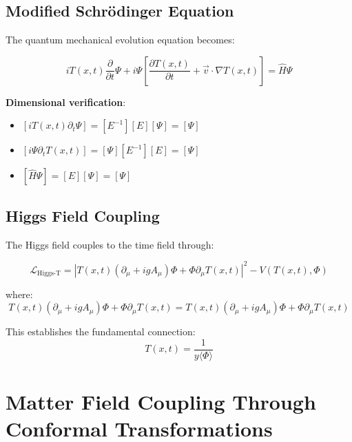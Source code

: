 \documentclass[12pt,a4paper]{article}
\newcommand{\Tfield}{T(x,t)}
\newcommand{\DhiggsT}{\Tfield (\partial_\mu + ig A_\mu) \Phi + \Phi \partial_\mu \Tfield}
\theoremstyle{definition}
\theoremstyle{remark}
\begin{document}
	\subsection{Modified Schrödinger Equation}
	\label{subsec:modified_schrodinger}
	
	The quantum mechanical evolution equation becomes:
	
	\begin{equation}
		i \Tfield \frac{\partial}{\partial t} \Psi + i \Psi \left[\frac{\partial \Tfield}{\partial t} + \vec{v} \cdot \nabla \Tfield\right] = \hat{H} \Psi
		\label{eq:modified_schrodinger}
	\end{equation}
	
	\textbf{Dimensional verification}:
	\begin{itemize}
		\item $[i \Tfield \partial_t \Psi] = [E^{-1}][E][\Psi] = [\Psi]$
		\item $[i \Psi \partial_t \Tfield] = [\Psi][E^{-1}][E] = [\Psi]$
		\item $[\hat{H} \Psi] = [E][\Psi] = [\Psi]$ \checkmark
	\end{itemize}
	
	\subsection{Higgs Field Coupling}
	\label{subsec:higgs_coupling}
	
	The Higgs field couples to the time field through:
	
	\begin{equation}
		\mathcal{L}_{\text{Higgs-T}} = |\DhiggsT|^2 - V(\Tfield, \Phi)
		\label{eq:higgs_time_coupling}
	\end{equation}
	
	where:
	\begin{equation}
		\DhiggsT = \Tfield (\partial_\mu + ig A_\mu) \Phi + \Phi \partial_\mu \Tfield
		\label{eq:higgs_connection}
	\end{equation}
	
	This establishes the fundamental connection:
	\begin{equation}
		\Tfield = \frac{1}{y\langle\Phi\rangle}
		\label{eq:time_higgs_relation}
	\end{equation}
	
	\section{Matter Field Coupling Through Conformal Transformations}
	\label{sec:matter_coupling}
	
\end{document}
